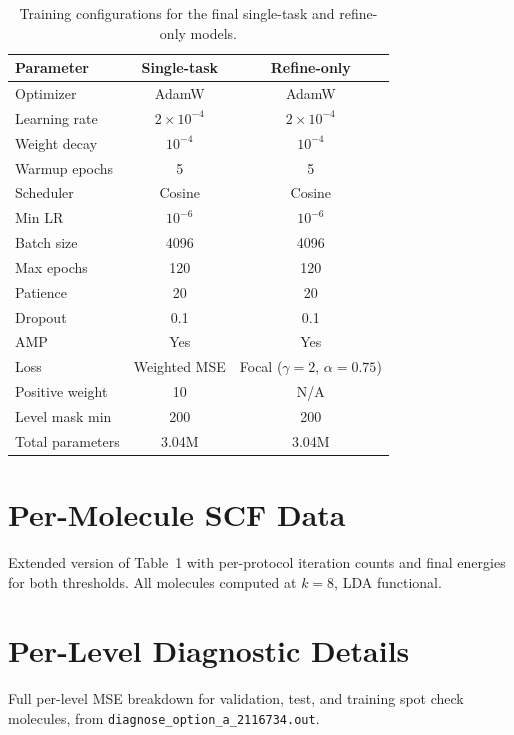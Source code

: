 \documentclass[journal=jctcce]{achemso}
\begin{document}
\begin{table}[htbp]
\centering
\caption{Training configurations for the final single-task and
refine-only models.}
\begin{tabular}{lcc}
\toprule
Parameter & Single-task & Refine-only \\
\midrule
Optimizer & AdamW & AdamW \\
Learning rate & $2 \times 10^{-4}$ & $2 \times 10^{-4}$ \\
Weight decay & $10^{-4}$ & $10^{-4}$ \\
Warmup epochs & 5 & 5 \\
Scheduler & Cosine & Cosine \\
Min LR & $10^{-6}$ & $10^{-6}$ \\
Batch size & 4096 & 4096 \\
Max epochs & 120 & 120 \\
Patience & 20 & 20 \\
Dropout & 0.1 & 0.1 \\
AMP & Yes & Yes \\
Loss & Weighted MSE & Focal ($\gamma=2$, $\alpha=0.75$) \\
Positive weight & 10 & N/A \\
Level mask min & 200 & 200 \\
Total parameters & 3.04M & 3.04M \\
\bottomrule
\end{tabular}
\end{table}

\section{Per-Molecule SCF Data}

Extended version of Table~1 with per-protocol iteration counts and
final energies for both thresholds. All molecules computed at
$k=8$, LDA functional.


\section{Per-Level Diagnostic Details}

Full per-level MSE breakdown for validation, test, and training spot
check molecules, from \texttt{diagnose\_option\_a\_2116734.out}.

\end{document}
